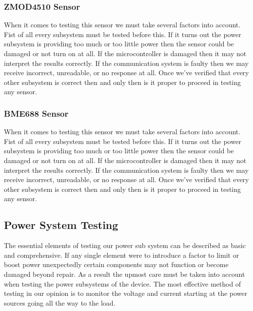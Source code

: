 \subsubsection{ZMOD4510 Sensor}
When it comes to testing this sensor we must take several factors into account. Fist of all every subsystem must be tested before this. If it turns out the power subsystem is providing too much or too little power then the sensor could be damaged or not turn on at all. If the microcontroller is damaged then it may not interpret the results correctly. If the communication system is faulty then we may receive incorrect, unreadable, or no response at all. Once we've verified that every other subsystem is correct then and only then is it proper to proceed in testing any sensor.

\subsubsection{BME688 Sensor}
When it comes to testing this sensor we must take several factors into account. Fist of all every subsystem must be tested before this. If it turns out the power subsystem is providing too much or too little power then the sensor could be damaged or not turn on at all. If the microcontroller is damaged then it may not interpret the results correctly. If the communication system is faulty then we may receive incorrect, unreadable, or no response at all. Once we've verified that every other subsystem is correct then and only then is it proper to proceed in testing any sensor.

\subsection{Power System Testing}
The essential elements of testing our power sub system can be described as basic and comprehensive. If any single element were to introduce a factor to limit or boost power unexpectedly certain components may not function or become damaged beyond repair. As a result the upmost care must be taken into account when testing the power subsystems of the device. The most effective method of testing in our opinion is to monitor the voltage and current starting at the power sources going all the way to the load. 

